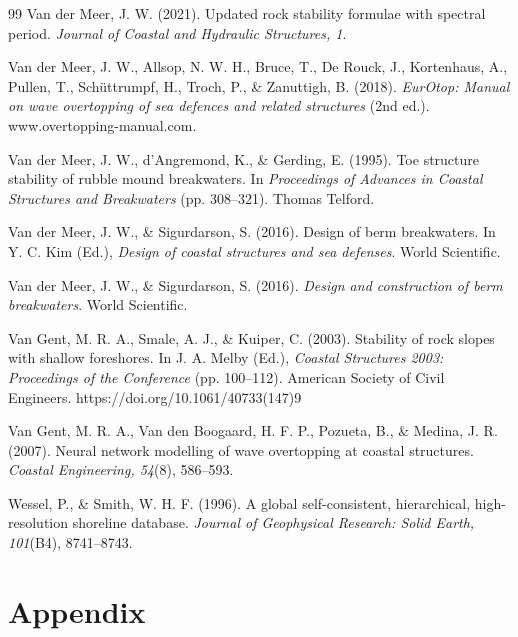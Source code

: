 \documentclass[a4paper, 11pt]{article}
\begin{document}
\begin{thebibliography}{99}
Van der Meer, J. W. (2021). Updated rock stability formulae with spectral period. \textit{Journal of Coastal and Hydraulic Structures, 1}.

Van der Meer, J. W., Allsop, N. W. H., Bruce, T., De Rouck, J., Kortenhaus, A., Pullen, T., Sch\"{u}ttrumpf, H., Troch, P., \& Zanuttigh, B. (2018). \textit{EurOtop: Manual on wave overtopping of sea defences and related structures} (2nd ed.). www.overtopping-manual.com.

Van der Meer, J. W., d'Angremond, K., \& Gerding, E. (1995). Toe structure stability of rubble mound breakwaters. In \textit{Proceedings of Advances in Coastal Structures and Breakwaters} (pp. 308--321). Thomas Telford.

Van der Meer, J. W., \& Sigurdarson, S. (2016). Design of berm breakwaters. In Y. C. Kim (Ed.), \textit{Design of coastal structures and sea defenses}. World Scientific.

Van der Meer, J. W., \& Sigurdarson, S. (2016). \textit{Design and construction of berm breakwaters}. World Scientific.

Van Gent, M. R. A., Smale, A. J., \& Kuiper, C. (2003). Stability of rock slopes with shallow foreshores. In J. A. Melby (Ed.), \textit{Coastal Structures 2003: Proceedings of the Conference} (pp. 100--112). American Society of Civil Engineers. https://doi.org/10.1061/40733(147)9

Van Gent, M. R. A., Van den Boogaard, H. F. P., Pozueta, B., \& Medina, J. R. (2007). Neural network modelling of wave overtopping at coastal structures. \textit{Coastal Engineering, 54}(8), 586--593.

Wessel, P., \& Smith, W. H. F. (1996). A global self-consistent, hierarchical, high-resolution shoreline database. \textit{Journal of Geophysical Research: Solid Earth, 101}(B4), 8741--8743.

\end{thebibliography}
\newpage

\appendix
\section{Appendix}
\end{document}
